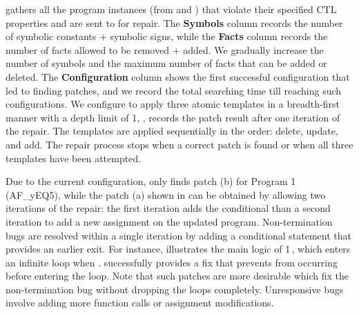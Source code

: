  gathers all the program instances (from  and ) that violate their specified CTL properties and are sent to \toolName for repair.   
The \textbf{Symbols} column records the number of symbolic constants + symbolic signs, while the \textbf{Facts} column records the number of facts allowed to be removed + added. 
We gradually increase the number of symbols and the maximum number of facts that can be added or deleted. 
The \textbf{Configuration} column shows the first successful configuration that led to finding patches, and we record the total searching time till reaching such configurations. 
We configure \toolName to apply three atomic templates in a breadth-first manner with a depth limit of 1, \ie,  records the patch result after one iteration of the repair. 
The templates are applied sequentially in the order: delete, update, and add. The repair process stops when a correct patch is found or when all three templates have been attempted. 

Due to the current configuration, \toolName only finds patch (b) for Program 1 (AF\_yEQ5), while the patch (a) shown in  can be obtained by allowing two iterations of the repair: the first iteration adds the conditional than a second iteration to add a new assignment on the updated program. 
Non-termination bugs are resolved within a single iteration by adding a conditional statement that provides an earlier exit. 
For instance,  illustrates the main logic of 1\,\xmark, which enters an infinite loop when . 
\toolName successfully 
provides a fix that prevents  from occurring before entering the loop. Note that such patches are more desirable which fix the non-termination bug without dropping the loops completely. 
Unresponsive bugs involve adding more function calls or assignment modifications. 

